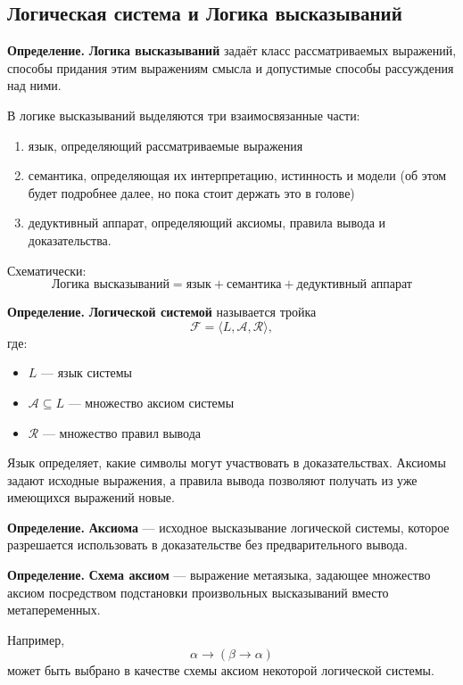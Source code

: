 \documentclass[12pt,a4paper,oneside,openany]{book}
\theoremstyle{definition}
\theoremstyle{plain}
\theoremstyle{remark}
\begin{document}
\subsection{Логическая система и Логика высказываний}

\textbf{Определение.}
\textbf{Логика высказываний} задаёт класс рассматриваемых выражений,
способы придания этим выражениям смысла и допустимые способы рассуждения
над ними.

В логике высказываний  выделяются три взаимосвязанные части:
\begin{enumerate}
    \item язык, определяющий рассматриваемые выражения
    \item семантика, определяющая их интерпретацию, истинность и модели (об этом будет подробнее далее, но пока стоит держать это в голове)
    \item дедуктивный аппарат, определяющий аксиомы, правила вывода
          и доказательства.
\end{enumerate}

Схематически:
\[
\boxed{
\text{Логика высказываний}
=
\text{язык}
+
\text{семантика}
+
\text{дедуктивный аппарат}
}
\]


\vspace{5mm}
\textbf{Определение.}
\textbf{Логической системой} называется тройка
\[
\mathcal{F}=\langle L,\mathcal{A},\mathcal{R}\rangle,
\]
где:
\begin{itemize}
    \item \(L\) --- язык системы
    \item \(\mathcal{A}\subseteq L\) --- множество аксиом системы
    \item \(\mathcal{R}\) --- множество правил вывода
\end{itemize}

Язык определяет, какие символы могут участвовать в доказательствах.
Аксиомы задают исходные выражения, а правила вывода позволяют получать
из уже имеющихся выражений новые.
\vspace{7mm}


\textbf{Определение.}
\textbf{Аксиома} --- исходное высказывание логической системы, которое
разрешается использовать в доказательстве без предварительного вывода.

\textbf{Определение.}
\textbf{Схема аксиом} --- выражение метаязыка, задающее множество аксиом
посредством подстановки произвольных высказываний вместо
метапеременных.

Например,
\[
\alpha\to(\beta\to\alpha)
\]
может быть выбрано в качестве схемы аксиом некоторой логической системы.
\end{document}
